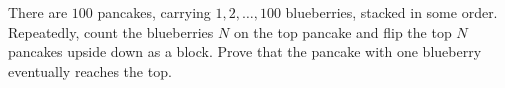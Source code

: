 There are $100$ pancakes, carrying $1,2,\dots,100$ blueberries, stacked in some order. Repeatedly, count the blueberries $N$ on the top pancake and flip the top $N$ pancakes upside down as a block. Prove that the pancake with one blueberry eventually reaches the top.
